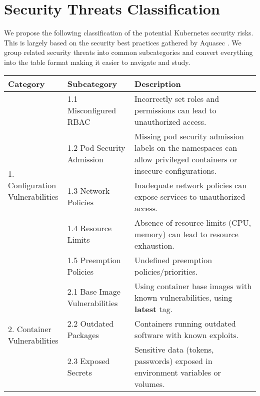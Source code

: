 \section{Security Threats Classification}
\label{sec:security-threats-classification}

We propose the following classification of the potential Kubernetes security risks. This is largely based on the security best practices gathered by Aquasec \cite{aquasec-security-best-practices,aquasec-kubernetes-vulnerability-database-misconfigurations}. We group related security threats into common subcategories and convert everything into the table format making it easier to navigate and study.

\begin{table}[H]
\begin{center}
        \begin{tabular}{ | p{} | p{} | p{} | } 
        \hline
        \textbf{Category} & \textbf{Subcategory} & \textbf{Description} \\ [0.5ex] 
        \hline\hline
        \multirow{5}{*}{\parbox{.20\textwidth}{1. Configuration \\ Vulnerabilities}} 
        & 1.1 Misconfigured RBAC  & Incorrectly set roles and permissions can lead to unauthorized access.  \\ \cline{2-3} 
        & 1.2 Pod Security Admission & Missing pod security admission labels on the namespaces can allow privileged containers or insecure configurations.  \\ \cline{2-3} 
        & 1.3 Network Policies  & Inadequate network policies can expose services to unauthorized access.  \\ \cline{2-3} 
        & 1.4 Resource Limits  & Absence of resource limits (CPU, memory) can lead to resource exhaustion.  \\ \cline{2-3} 
        & 1.5 Preemption Policies & Undefined preemption policies/priorities. \\ \hline

        \multirow{3}{*}{\parbox{.20\textwidth}{2. Container \\ Vulnerabilities}} 
        & 2.1 Base Image Vulnerabilities & Using container base images with known vulnerabilities, using \textbf{latest} tag. \\ \cline{2-3} 
        & 2.2 Outdated Packages & Containers running outdated software with known exploits. \\ \cline{2-3} 
        & 2.3 Exposed Secrets & Sensitive data (tokens, passwords) exposed in environment variables or volumes. \\ \hline


\end{tabular}
\end{center}
\end{table}
